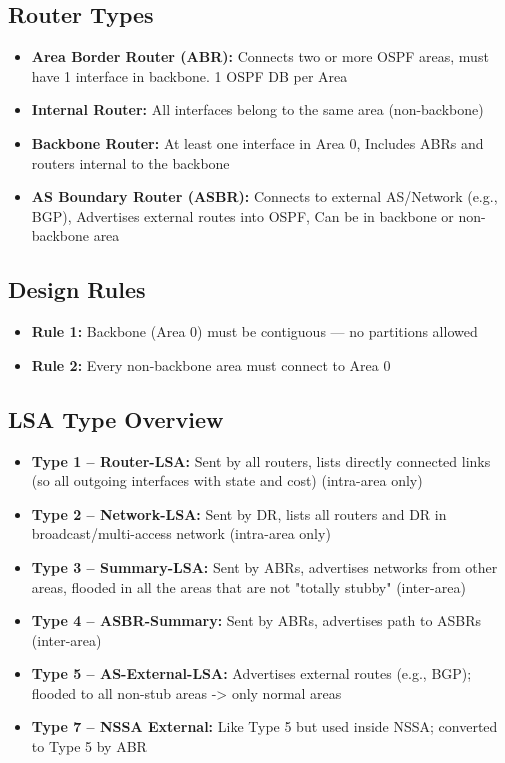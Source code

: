 \begin{multicols*}{5}
		\subsection{Router Types}
		\begin{itemize}
			\item \textbf{Area Border Router (ABR):} Connects two or more OSPF areas, must have 1 interface in backbone. 1 OSPF DB per Area
			\item \textbf{Internal Router:} All interfaces belong to the same area (non-backbone)
			\item \textbf{Backbone Router:} At least one interface in Area 0, Includes ABRs and routers internal to the backbone
			\item \textbf{AS Boundary Router (ASBR):} Connects to external AS/Network (e.g., BGP), Advertises external routes into OSPF, Can be in backbone or non-backbone area
		\end{itemize}
		\subsection{Design Rules}
		\begin{itemize}
			\item \textbf{Rule 1:} Backbone (Area 0) must be contiguous — no partitions allowed
			\item \textbf{Rule 2:} Every non-backbone area must connect to Area 0
		\end{itemize}
		
		\subsection{LSA Type Overview}
		\begin{itemize}
			\item \textbf{Type 1 – Router-LSA:} Sent by all routers, lists directly connected links (so all outgoing interfaces with state and cost) (intra-area only)
			\item \textbf{Type 2 – Network-LSA:} Sent by DR, lists all routers and DR in broadcast/multi-access network (intra-area only)
			\item \textbf{Type 3 – Summary-LSA:} Sent by ABRs, advertises networks from other areas, flooded in all the areas that are not "totally stubby" (inter-area)
			\item \textbf{Type 4 – ASBR-Summary:} Sent by ABRs, advertises path to ASBRs (inter-area)
			\item \textbf{Type 5 – AS-External-LSA:} Advertises external routes (e.g., BGP); flooded to all non-stub areas -> only normal areas
			\item \textbf{Type 7 – NSSA External:} Like Type 5 but used inside NSSA; converted to Type 5 by ABR
		\end{itemize}

\end{multicols*}
